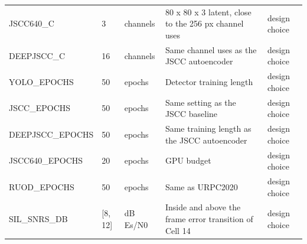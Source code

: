 \begin{table}[t]
\begin{tabular}{p{3.3cm}p{2.6cm}p{1.6cm}p{6.6cm}p{2.0cm}}
JSCC640\_C & 3 & channels & 80 x 80 x 3 latent, close to the 256 px channel uses & design choice \\
DEEPJSCC\_C & 16 & channels & Same channel uses as the JSCC autoencoder & design choice \\
YOLO\_EPOCHS & 50 & epochs & Detector training length & design choice \\
JSCC\_EPOCHS & 50 & epochs & Same setting as the JSCC baseline & design choice \\
DEEPJSCC\_EPOCHS & 50 & epochs & Same training length as the JSCC autoencoder & design choice \\
JSCC640\_EPOCHS & 20 & epochs & GPU budget & design choice \\
RUOD\_EPOCHS & 50 & epochs & Same as URPC2020 & design choice \\
SIL\_SNRS\_DB & [8, 12] & dB Es/N0 & Inside and above the frame error transition of Cell 14 & design choice \\
\hline
\end{tabular}
\end{table}
